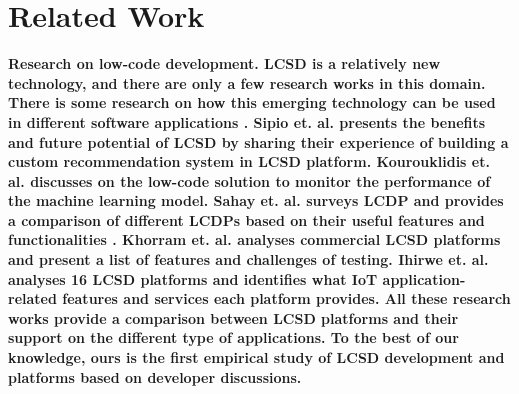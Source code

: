 \section{Related Work} \label{sec:related_work}
\nd\bf{Research on low-code development.} LCSD is a relatively new technology, and there are only a few research works in this domain. There is some research on how this emerging technology can be used
in different software applications \cite{lowcodeapp}. Sipio et.
al.\cite{di2020democratizing} presents the benefits and future potential of LCSD
by sharing their experience of building a custom recommendation system in LCSD
platform. Kourouklidis et. al. \cite{kourouklidis2020towards} discusses on
the low-code solution to monitor the performance of the machine learning model. Sahay
et. al. surveys  LCDP and provides a comparison of different LCDPs based on
their useful features and functionalities \cite{sahay2020supporting}. Khorram
et. al.\cite{lowcodetesting} analyses commercial LCSD platforms and present a
list of features and challenges of testing. Ihirwe et. al.~\cite{lowcodeIot}
analyses 16 LCSD platforms and identifies what IoT application-related features and services each platform provides. All these research works
provide a comparison between LCSD platforms and their support on the different type
of applications\cite{alonso2020towards}. To the best of our knowledge, ours is the first empirical study of  LCSD development and platforms based on developer discussions.


